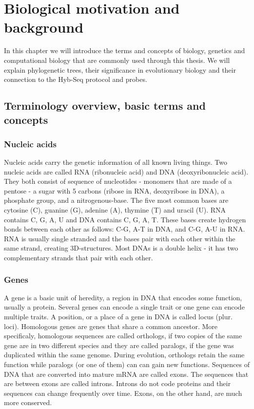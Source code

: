 \chapter[Biological motivation]{Biological motivation and background}
\label{kap:biological_motivation}

In this chapter we will introduce the terms and concepts of biology, genetics and computational biology that 
are commonly used through this thesis. 
We will explain phylogenetic trees, their significance in evolutionary biology and 
their connection to the Hyb-Seq protocol and probes. 

\section{Terminology overview, basic terms and concepts}

\subsection{Nucleic acids}
Nucleic acids carry the genetic information of all known living things. Two nucleic acids are called RNA 
(ribonucleic acid) and DNA (deoxyribonucleic acid). They both consist of sequence of nucleotides 
- monomers that are made of a pentose - a sugar with 5 carbons (ribose in RNA, deoxyribose in DNA), a 
phosphate group, and a nitrogenous-base. The five most common bases are cytosine (C), guanine (G), 
adenine (A), thymine (T) and uracil (U). RNA contains C, G, A, U and DNA contains C, G, A, T. These bases 
create hydrogen bonds between each other as follows: C-G, A-T in DNA, and C-G, A-U in RNA. 
RNA is usually single stranded and the bases pair with each other within the same strand, creating 3D-structures. 
Most DNAs is a double helix - it has two complementary strands that pair with each other. 
\cite{cellbiology}

\subsection{Genes}
A gene is a basic unit of heredity, a region in DNA that encodes some function, usually a protein. Several genes 
can encode a single trait or one gene can encode multiple traits. A position, or a place of a gene in DNA is called 
locus (plur. loci). Homologous genes are genes that share a common ancestor. More specificaly, homologous sequences are 
called orthologs, if two copies of the same gene are in two different species and they are called paralogs, if the gene was 
duplicated within the same genome. During evolution, orthologs retain the same function while paralogs (or one of them) can 
can gain new functions. 
Sequences of DNA that are converted into mature mRNA are called exons. The sequences that are between exons are called introns. 
Introns do not code proteins and their sequences can change frequently over time. Exons, on the other hand, are much more 
conserved. 
\cite{cellbiology}

